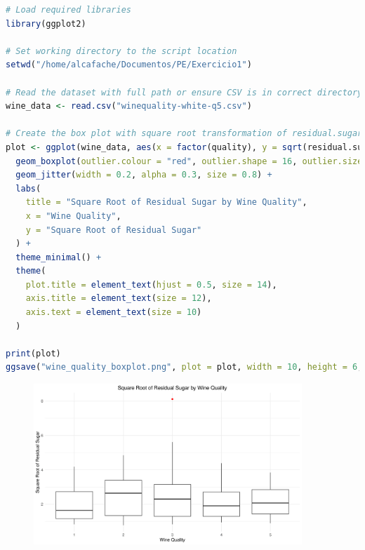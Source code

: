 \documentclass[11pt,a4paper]{article}
\begin{document}
\begin{lstlisting}[language=R]
# Load required libraries
library(ggplot2)

# Set working directory to the script location
setwd("/home/alcafache/Documentos/PE/Exercicio1")

# Read the dataset with full path or ensure CSV is in correct directory
wine_data <- read.csv("winequality-white-q5.csv")

# Create the box plot with square root transformation of residual.sugar
plot <- ggplot(wine_data, aes(x = factor(quality), y = sqrt(residual.sugar))) +
  geom_boxplot(outlier.colour = "red", outlier.shape = 16, outlier.size = 2) +
  geom_jitter(width = 0.2, alpha = 0.3, size = 0.8) +
  labs(
    title = "Square Root of Residual Sugar by Wine Quality",
    x = "Wine Quality",
    y = "Square Root of Residual Sugar"
  ) +
  theme_minimal() +
  theme(
    plot.title = element_text(hjust = 0.5, size = 14),
    axis.title = element_text(size = 12),
    axis.text = element_text(size = 10)
  )

print(plot)
ggsave("wine_quality_boxplot.png", plot = plot, width = 10, height = 6, dpi = 300)
\end{lstlisting}

\begin{figure}[htbp]
    \centering
    \includegraphics[width=0.9\textwidth]{wine_quality_boxplot.png}
\end{figure}
\end{document}
